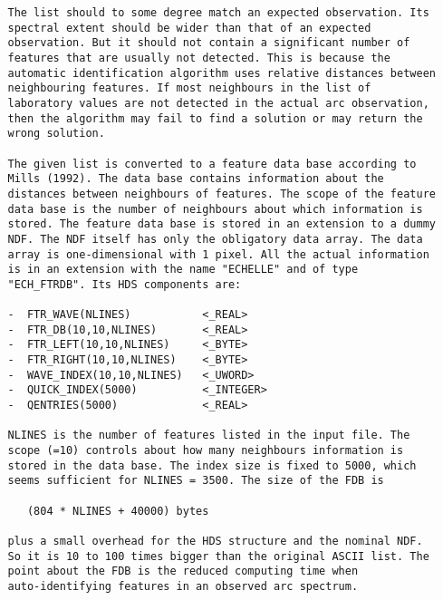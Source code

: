\begin{description}
\begin{verbatim}
   The list should to some degree match an expected observation. Its
   spectral extent should be wider than that of an expected
   observation. But it should not contain a significant number of
   features that are usually not detected. This is because the
   automatic identification algorithm uses relative distances between
   neighbouring features. If most neighbours in the list of
   laboratory values are not detected in the actual arc observation,
   then the algorithm may fail to find a solution or may return the
   wrong solution.

   The given list is converted to a feature data base according to
   Mills (1992). The data base contains information about the
   distances between neighbours of features. The scope of the feature
   data base is the number of neighbours about which information is
   stored. The feature data base is stored in an extension to a dummy
   NDF. The NDF itself has only the obligatory data array. The data
   array is one-dimensional with 1 pixel. All the actual information
   is in an extension with the name "ECHELLE" and of type
   "ECH_FTRDB". Its HDS components are:

   -  FTR_WAVE(NLINES)           <_REAL>
   -  FTR_DB(10,10,NLINES)       <_REAL>
   -  FTR_LEFT(10,10,NLINES)     <_BYTE>
   -  FTR_RIGHT(10,10,NLINES)    <_BYTE>
   -  WAVE_INDEX(10,10,NLINES)   <_UWORD>
   -  QUICK_INDEX(5000)          <_INTEGER>
   -  QENTRIES(5000)             <_REAL>

   NLINES is the number of features listed in the input file. The
   scope (=10) controls about how many neighbours information is
   stored in the data base. The index size is fixed to 5000, which
   seems sufficient for NLINES = 3500. The size of the FDB is

      (804 * NLINES + 40000) bytes

   plus a small overhead for the HDS structure and the nominal NDF.
   So it is 10 to 100 times bigger than the original ASCII list. The
   point about the FDB is the reduced computing time when
   auto-identifying features in an observed arc spectrum.

\end{verbatim}
\end{description}
